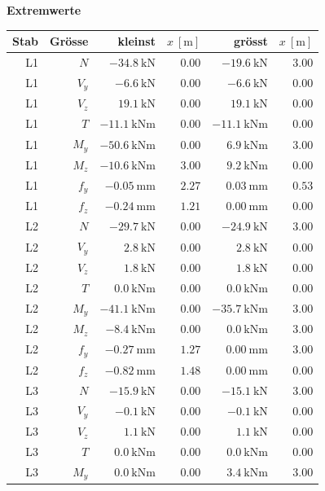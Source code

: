 \documentclass[11pt,a4paper]{article}
\begin{document}
\noindent\textbf{Extremwerte}
\begin{longtable}{rrrrrr}
\hline
Stab & Grösse & kleinst & $x\ [\mathrm{m}]$ & grösst & $x\ [\mathrm{m}]$ \\
\hline
\endhead
L1 & $N$ & $-34.8\ \mathrm{kN}$ & $0.00$ & $-19.6\ \mathrm{kN}$ & $3.00$ \\
L1 & $V_y$ & $-6.6\ \mathrm{kN}$ & $0.00$ & $-6.6\ \mathrm{kN}$ & $0.00$ \\
L1 & $V_z$ & $19.1\ \mathrm{kN}$ & $0.00$ & $19.1\ \mathrm{kN}$ & $0.00$ \\
L1 & $T$ & $-11.1\ \mathrm{kNm}$ & $0.00$ & $-11.1\ \mathrm{kNm}$ & $0.00$ \\
L1 & $M_y$ & $-50.6\ \mathrm{kNm}$ & $0.00$ & $6.9\ \mathrm{kNm}$ & $3.00$ \\
L1 & $M_z$ & $-10.6\ \mathrm{kNm}$ & $3.00$ & $9.2\ \mathrm{kNm}$ & $0.00$ \\
L1 & $f_y$ & $-0.05\ \mathrm{mm}$ & $2.27$ & $0.03\ \mathrm{mm}$ & $0.53$ \\
L1 & $f_z$ & $-0.24\ \mathrm{mm}$ & $1.21$ & $0.00\ \mathrm{mm}$ & $0.00$ \\
L2 & $N$ & $-29.7\ \mathrm{kN}$ & $0.00$ & $-24.9\ \mathrm{kN}$ & $3.00$ \\
L2 & $V_y$ & $2.8\ \mathrm{kN}$ & $0.00$ & $2.8\ \mathrm{kN}$ & $0.00$ \\
L2 & $V_z$ & $1.8\ \mathrm{kN}$ & $0.00$ & $1.8\ \mathrm{kN}$ & $0.00$ \\
L2 & $T$ & $0.0\ \mathrm{kNm}$ & $0.00$ & $0.0\ \mathrm{kNm}$ & $0.00$ \\
L2 & $M_y$ & $-41.1\ \mathrm{kNm}$ & $0.00$ & $-35.7\ \mathrm{kNm}$ & $3.00$ \\
L2 & $M_z$ & $-8.4\ \mathrm{kNm}$ & $0.00$ & $0.0\ \mathrm{kNm}$ & $3.00$ \\
L2 & $f_y$ & $-0.27\ \mathrm{mm}$ & $1.27$ & $0.00\ \mathrm{mm}$ & $3.00$ \\
L2 & $f_z$ & $-0.82\ \mathrm{mm}$ & $1.48$ & $0.00\ \mathrm{mm}$ & $0.00$ \\
L3 & $N$ & $-15.9\ \mathrm{kN}$ & $0.00$ & $-15.1\ \mathrm{kN}$ & $3.00$ \\
L3 & $V_y$ & $-0.1\ \mathrm{kN}$ & $0.00$ & $-0.1\ \mathrm{kN}$ & $0.00$ \\
L3 & $V_z$ & $1.1\ \mathrm{kN}$ & $0.00$ & $1.1\ \mathrm{kN}$ & $0.00$ \\
L3 & $T$ & $0.0\ \mathrm{kNm}$ & $0.00$ & $0.0\ \mathrm{kNm}$ & $0.00$ \\
L3 & $M_y$ & $0.0\ \mathrm{kNm}$ & $0.00$ & $3.4\ \mathrm{kNm}$ & $3.00$ \\

\end{longtable}
\end{document}
